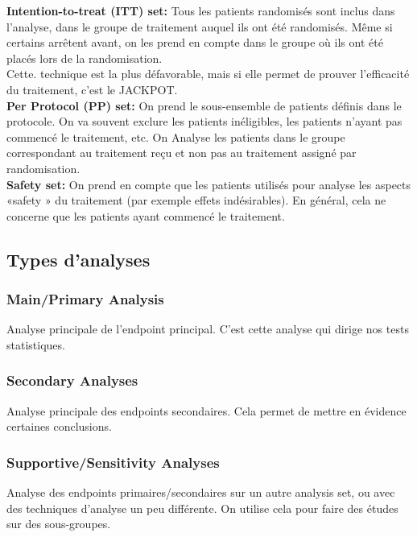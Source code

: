 \textbf{Intention-to-treat (ITT) set:}
Tous les patients randomisés sont inclus dans l’analyse, dans le groupe de traitement auquel ils ont été randomisés. Même si certains arrêtent avant, on les prend en compte dans le groupe où ils ont été placés lors de la randomisation.\\
Cette. technique est la plus défavorable, mais si elle permet de prouver l'efficacité du traitement, c'est le JACKPOT.\\

\textbf{Per Protocol (PP) set:}
On prend le sous-ensemble de patients définis dans le protocole. On va souvent exclure les patients inéligibles, les patients n’ayant pas commencé le traitement, etc. On Analyse les patients dans le groupe correspondant au traitement reçu et non pas au traitement assigné par randomisation.\\

\textbf{Safety set:}
On prend en compte que les patients utilisés pour analyse les aspects «safety » du traitement (par exemple effets indésirables). En général, cela ne concerne que les patients ayant commencé le traitement.

\subsection{Types d’analyses}

\subsubsection{Main/Primary Analysis}
Analyse principale de l’endpoint principal. C'est cette analyse qui dirige nos tests statistiques.

\subsubsection{Secondary Analyses}
Analyse principale des endpoints secondaires. Cela permet de mettre en évidence certaines conclusions.

\subsubsection{Supportive/Sensitivity Analyses}
Analyse des endpoints primaires/secondaires sur un autre analysis set, ou avec des techniques d’analyse un peu différente. On utilise cela pour faire des études sur des sous-groupes. 

